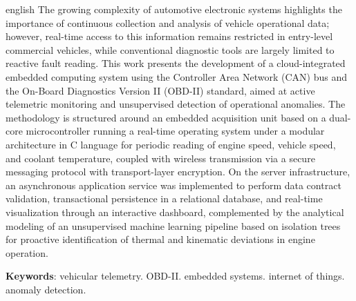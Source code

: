 \documentclass[
	12pt,				%
	openright,			%
	twoside,			%
	a4paper,			%
	english,			%
	brazil				%
	]{abntex2}
\begin{document}
\begin{resumo}[Abstract]
\begin{otherlanguage*}{english}
The growing complexity of automotive electronic systems highlights the importance of
continuous collection and analysis of vehicle operational data; however, real-time
access to this information remains restricted in entry-level commercial vehicles, while
conventional diagnostic tools are largely limited to reactive fault reading. This work
presents the development of a cloud-integrated embedded computing system using the
Controller Area Network (CAN) bus and the On-Board Diagnostics Version II (OBD-II)
standard, aimed at active telemetric monitoring and unsupervised detection of
operational anomalies. The methodology is structured around an embedded acquisition unit
based on a dual-core microcontroller running a real-time operating system under a
modular architecture in C language for periodic reading of engine speed, vehicle speed,
and coolant temperature, coupled with wireless transmission via a secure messaging
protocol with transport-layer encryption. On the server infrastructure, an asynchronous
application service was implemented to perform data contract validation, transactional
persistence in a relational database, and real-time visualization through an interactive
dashboard, complemented by the analytical modeling of an unsupervised machine learning
pipeline based on isolation trees for proactive identification of thermal and kinematic
deviations in engine operation.

\vspace{\onelineskip}

\noindent
\textbf{Keywords}: vehicular telemetry. OBD-II. embedded systems. internet of things.
anomaly detection.
\end{otherlanguage*}
\end{resumo}

\listoffigures*
\cleardoublepage

\listoftables*
\cleardoublepage
\end{document}
